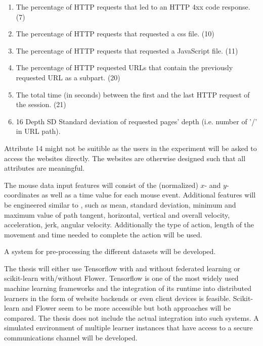 \documentclass[
    fontsize=12pt,
    headings=small,
    parskip=half,           %
    bibliography=totoc,
    numbers=noenddot,       %
    open=any,               %
    final                   %
    ]{scrreprt}
\begin{document}
\begin{enumerate}
	\item The percentage of HTTP requests that led to an HTTP 4xx code response. (7)
	\item The percentage of HTTP requests that requested a css file. (10)
	\item The percentage of HTTP requests that requested a JavaScript file. (11)
	\item The percentage of HTTP requested URLs that contain the previously requested URL as a subpart. (20)
	\item The total time (in seconds) between the first and the last HTTP request of the session. (21)
	\item 16 Depth SD Standard deviation of requested pages' depth (i.e. number of ’/’ in URL path).
\end{enumerate}

Attribute 14 might not be suitible as the users in the experiment will be asked to access the websites directly. The websites are otherwise designed such that all attributes are meaningful.

The mouse data input features will consist of the (normalized) $x$- and $y$-coordinates as well as a time value for each mouse event. Additional features will be engineered similar to \cite{DBLP:journals/corr/abs-1810-04668}, such as mean, standard deviation, minimum and maximum value of path tangent, horizontal, vertical and overall velocity, acceleration, jerk, angular velocity. Additionally the type of action, length of the movement and time needed to complete the action will be used.

A system for pre-processing the different datasets will be developed.

The thesis will either use Tensorflow with and without federated learning or scikit-learn with/without Flower.
Tensorflow is one of the most widely used machine learning frameworks and the integration of its runtime into distributed learners in the form of website backends or even client devices is feasible. Scikit-learn and Flower seem to be more accessible but both approaches will be compared. The thesis does not include the actual integration into such systems. A simulated environment of multiple learner instances that have access to a secure communications channel will be developed.
\end{document}

